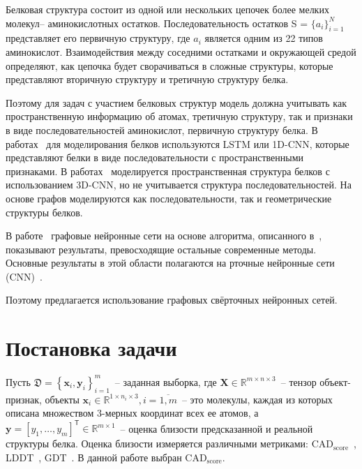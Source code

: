 \documentclass[14pt]{extarticle}
\begin{document}
Белковая структура состоит из одной или нескольких цепочек более мелких молекул-- аминокислотных остатков. Последовательность остатков S = $\{a_i\}_{i=1}^N$ представляет его первичную структуру, где $a_i$ является одним из 22 типов аминокислот. Взаимодействия между соседними остатками и окружающей средой определяют, как цепочка будет сворачиваться в сложные структуры, которые представляют вторичную структуру и третичную структуру белка.

Поэтому для задач с участием белковых структур модель должна учитывать как пространственную информацию об атомах, третичную структуру, так и признаки в виде последовательностей аминокислот, первичную структуру белка.  В работах~\cite{HurtadoQA, AngularQA} для моделирования белков используются LSTM или 1D-CNN, которые представляют белки в виде последовательности с пространственными признаками.  В работах~\cite{3DCNN, 10.1093/bioinformatics/btz122} моделируется пространственная структура белков с использованием 3D-CNN, но не учитывается структура последовательностей. На основе графов моделируются как последовательности, так и геометрические структуры белков. 

В работе~\cite{Baldassarre2019GraphQAPM} графовые нейронные сети на основе алгоритма, описанного в~\cite{Battaglia2018RelationalIB}, показывают результаты, превосходящие остальные современные методы. Основные результаты в этой области полагаются на рточные нейронные сети (CNN)~\cite{10.1093/bioinformatics/btz122}. 

Поэтому предлагается использование графовых свёрточных нейронных сетей. 

\section{Постановка задачи}

Пусть $\mathfrak{D} = \left\{\mathbf{x}_i, \mathbf{y}_i\right\}_{i=1}^m$~-- заданная выборка, где $\mathbf{X}\in \mathbb{R}^{m\times n\times 3}$~-- тензор объект-признак, объекты $\mathbf{x}_i\in \mathbb{R}^{1\times n_i\times 3}, i=\overline{1,m}$~-- это молекулы, каждая из которых описана множеством 3-мерных координат всех ее атомов, а $\mathbf{y} = [y_1,\dots, y_m]^{\mathsf{T}}\in \mathbb{R}^{m\times 1}$~-- оценка близости предсказанной и реальной структуры белка. Оценка близости измеряется различными метриками: $\text{CAD}_\text{score}$~\cite{Olechnovic2013CADscoreAN}, LDDT~\cite{Mariani2013lDDTAL}, GDT~\cite{GDT}. В данной работе выбран $\text{CAD}_\text{score}$. 
\end{document}
